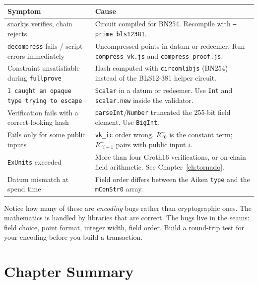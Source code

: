 \begin{center}
\begin{tabular}{p{4.6cm}p{7.4cm}}
  \hline
  \textbf{Symptom} & \textbf{Cause} \\
  \hline
  snarkjs verifies, chain rejects
    & Circuit compiled for BN254. Recompile with
      \texttt{--prime bls12381}. \\
  \addlinespace
  \texttt{decompress} fails / script errors immediately
    & Uncompressed points in datum or redeemer. Run
      \texttt{compress\_vk.js} and \texttt{compress\_proof.js}. \\
  \addlinespace
  Constraint unsatisfiable during \texttt{fullprove}
    & Hash computed with \texttt{circomlibjs} (BN254) instead of the
      BLS12-381 helper circuit. \\
  \addlinespace
  \texttt{I caught an opaque type trying to escape}
    & \texttt{Scalar} in a datum or redeemer. Use \texttt{Int} and
      \texttt{scalar.new} inside the validator. \\
  \addlinespace
  Verification fails with a correct-looking hash
    & \texttt{parseInt}/\texttt{Number} truncated the 255-bit field
      element. Use \texttt{BigInt}. \\
  \addlinespace
  Fails only for some public inputs
    & \texttt{vk\_ic} order wrong. $IC_0$ is the constant term;
      $IC_{i+1}$ pairs with public input $i$. \\
  \addlinespace
  \texttt{ExUnits} exceeded
    & More than four Groth16 verifications, or on-chain field
      arithmetic. See Chapter~\ref{ch:tornado}. \\
  \addlinespace
  Datum mismatch at spend time
    & Field order differs between the Aiken \texttt{type} and the
      \texttt{mConStr0} array. \\
  \hline
\end{tabular}
\end{center}

\begin{remark}
Notice how many of these are \emph{encoding} bugs rather than cryptographic
ones. The mathematics is handled by libraries that are correct. The bugs live in
the seams: field choice, point format, integer width, field order. Build a
round-trip test for your encoding before you build a transaction.
\end{remark}

\section{Chapter Summary} \label{sec:ch7-summary}

